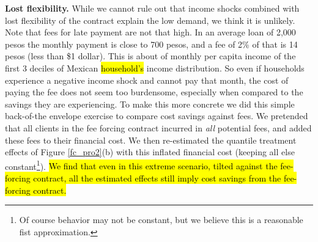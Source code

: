 \documentclass[11pt]{article}
\begin{document}
\vspace{.1in}
\noindent \textbf{Lost flexibility.} While we cannot rule out that income shocks combined with lost flexibility of the contract explain the low demand, we think it is unlikely. Note that fees for late payment are not that high. In an average loan of 2,000 pesos the monthly payment is close to 700 pesos, and a fee of 2\% of that is 14 pesos (less than \$1 dollar). This is about  of monthly per capita income of the first 3 deciles of Mexican \hl{household's} income distribution. %
So even if households experience a negative income shock and cannot pay that month, the cost of paying the fee does not seem too burdensome, especially when compared to the savings they are experiencing.  To make this more concrete we did this simple back-of-the envelope exercise to compare cost savings against fees. We pretended that all clients in the fee forcing contract incurred in \textit{all} potential fees, and added these fees to their financial cost. We then re-estimated the quantile treatment effects of Figure \ref{fc_pro2}(b) with this inflated financial cost (keeping all else constant\footnote{Of course behavior may not be constant, but we believe this is a reasonable fist approximation. %
}). \hl{We find that even in this extreme scenario, tilted against the fee-forcing contract, all the estimated effects still imply cost savings from the fee-forcing contract.}
\end{document}
